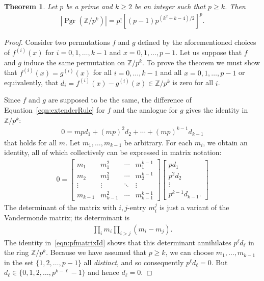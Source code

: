 \documentclass[oneside]{amsart}
\theoremstyle{nthm}
\newtheorem{thm2}[subsection]{Theorem}
\theoremstyle{ndef}
\theoremstyle{nrem}
\newcommand{\Z}{\mathbb{Z}}
\DeclareMathOperator{\Pgr}{Pgr}
\begin{document}
\begin{thm2}\label{thm:uniqueCount}
    Let $p$ be a prime and $k \geq 2$ be an integer such that $p \geq k$. Then
    \begin{align*}
        |\Pgr(\Z/p^k)| = p![(p-1)p^{(k^2+k-4)/2}]^p.
    \end{align*}
\end{thm2}
\begin{proof}
    Consider two permutations $f$ and $g$ defined by the aforementioned choices of $f^{(i)}(x)$ for $i = 0,1,\dots,k-1$ and $x = 0,1,\dots,p-1$. Let us suppose that $f$ and $g$ induce the same permutation on $\Z/p^k$. To prove the theorem we must show that $f^{(i)}(x) = g^{(i)}(x)$ for all $i = 0,\dots,k-1$ and all $x = 0,1,\dots,p-1$ or equivalently, that $d_i = f^{(i)}(x) - g^{(i)}(x) \in \Z/p^k$ is zero for all $i$.
    
    Since $f$ and $g$ are supposed to be the same, the difference of Equation~\eqref{eqn:extenderRule} for $f$ and the analogue for $g$ gives the identity in $\Z/p^k$:
    \begin{align*}
        0 = mpd_1 + (mp)^2d_2 + \cdots + (mp)^{k-1}d_{k-1}
    \end{align*}
    that holds for all $m$. Let $m_1,\dots,m_{k-1}$ be arbitrary. For each $m_i$, we obtain an identity, all of which collectively can be expressed in matrix notation:
    \begin{align}\label{eqn:pfmatrixId}
    0 = 
    \begin{bmatrix}
        m_1 & m_1^2 & \cdots & m_1^{k-1}\\
        m_2 & m_2^2 & \cdots & m_2^{k-1}\\
        \vdots & \vdots & \ddots & \vdots\\
        m_{k-1} & m_{k-1}^2 & \cdots & m_{k-1}^{k-1}
    \end{bmatrix}
    \begin{bmatrix}
        pd_1\\
        p^2d_2\\
        \vdots\\
        p^{k-1}d_{k-1}.
    \end{bmatrix}
\end{align}
The determinant of the matrix with $i,j$-entry $m_i^j$ is just a variant of the Vandermonde matrix; its determinant is
\begin{align*}
    \prod_i m_i \prod_{i > j} (m_i - m_j).
\end{align*}
The identity in~\eqref{eqn:pfmatrixId} shows that this determinant annihilates $p^\ell d_\ell$ in the ring $\Z/p^k$. Because we have assumed that $p \geq k$, we can choose $m_1,\dots,m_{k-1}$ in the set $\{1,2,\dots,p-1\}$ all \emph{distinct}, and so consequently $p^\ell d_\ell = 0$. But $d_\ell\in \{0,1,2,\dots,p^{k-\ell} - 1\}$ and hence $d_\ell = 0$.
\end{proof}
\end{document}
